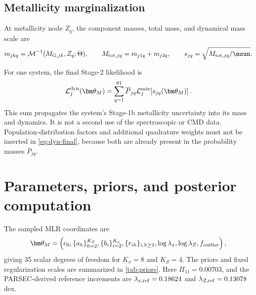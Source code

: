 \subsection{Metallicity marginalization}

At metallicity node $Z_q$, the component masses, total mass, and dynamical
mass scale are
\begin{equation}
 m_{jkq}=\mathcal{M}^{-1}(M_{{\rm G},jk},Z_q;\Theta),\qquad
 M_{{\rm tot},jq}=m_{j1q}+m_{j2q},\qquad
 s_{jq}=\sqrt{M_{{\rm tot},jq}/\msun}.
 \label{eq:node-mass-scale}
\end{equation}

For one system, the final Stage-2 likelihood is
\begin{equation}
 \mathcal L_j^{\rm dyn}(\bm\theta_M)=
 \sum_{q=1}^{81}\overline P_{jq}
 \mathcal L_j^{\rm mix}\!\left[s_{jq}(\bm\theta_M)\right].
 \label{eq:dyn-final}
\end{equation}
This sum propagates the system's Stage-1b metallicity uncertainty into its mass
and dynamics.  It is not a second use of the spectroscopic or CMD data.
Population-distribution factors and additional quadrature weights must not be
inserted in \cref{eq:dyn-final}, because both are already present in the
probability masses $\overline P_{jq}$.

\section{Parameters, priors, and posterior computation}
\label{sec:inference}

The sampled MLR coordinates are
\begin{equation}
 \bm\theta_M=\left(c_0,\{a_h\}_{h=2}^{K_Z},
 \{b_i\}_{i=2}^{K_x},\{r_{ih}\}_{i,h\ge2},
 \log\lambda_x,\log\lambda_Z,f_{\rm outlier}\right),
\end{equation}
giving 35 scalar degrees of freedom for $K_x=8$ and $K_Z=4$.  The priors and
fixed regularization scales are summarized in \cref{tab:priors}.  Here
$\Pi_{11}=0.00703$, and the PARSEC-derived reference increments are
$\lambda_{x,\rm ref}=0.18624$ and $\lambda_{Z,\rm ref}=0.13078$ dex.

